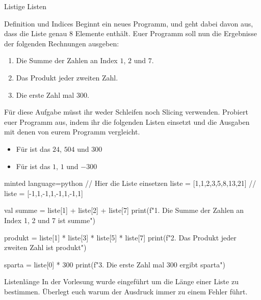 \begin{task}[points=auto]{Listige Listen}
    \begin{subtask*}[points=0]{Definition und Indices }
        Beginnt ein neues Programm, und geht dabei davon aus, dass die Liste
         genau $8$ Elemente enthält. Euer Programm soll
        nun die Ergebnisse der folgenden Rechnungen ausgeben:

        \begin{enumerate}
            \item Die Summe der Zahlen an Index $1$, $2$ und $7$.
            \item Das Produkt jeder zweiten Zahl.
            \item Die erste Zahl mal 300.
        \end{enumerate}

        Für diese Aufgabe müsst ihr weder Schleifen noch Slicing verwenden. Probiert
        euer Programm aus, indem ihr die folgenden Listen einsetzt und die Ausgaben
        mit denen von eurem Programm vergleicht.

        \begin{itemize}
            \item Für  ist das $24$, $504$ und $300$
            \item Für  ist das $1$, $1$ und $-300$
        \end{itemize}

        \begin{solution}
            \begin{codeBlock}[]{minted language=python}
                // Hier die Liste einsetzen
                liste = [1,1,2,3,5,8,13,21]
                // liste = [-1,1,-1,1,-1,1,-1,1]

                val summe = liste[1] + liste[2] + liste[7]
                print(f"1. Die Summe der Zahlen an Index 1, 2 und 7 ist {summe}")

                produkt = liste[1] * liste[3] * liste[5] * liste[7]
                print(f"2. Das Produkt jeder zweiten Zahl ist {produkt}")

                sparta = liste[0] * 300
                print(f"3. Die erste Zahl mal 300 ergibt {sparta}")
            \end{codeBlock}
        \end{solution}
    \end{subtask*}
    \begin{subtask*}[points=0]{Listenlänge }
        In der Vorlesung wurde  eingeführt um die Länge einer
        Liste zu bestimmen. Überlegt euch warum der Ausdruck 
        immer zu einem Fehler führt.


\end{subtask*}
\end{task}
